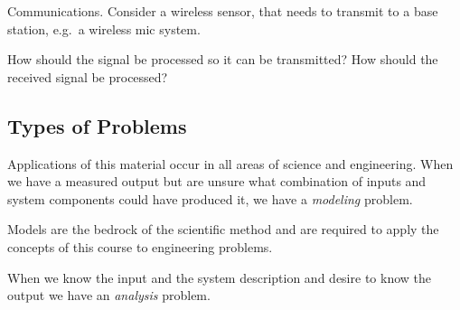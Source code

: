 \begin{example} Communications. Consider a wireless sensor, that needs to transmit to a base station, e.g.\ a wireless mic system. 
  \begin{center}
  \end{center}

  How should the signal be processed so it can be transmitted? How should the received signal be processed?
\end{example}

\subsection*{Types of Problems}
Applications of this material occur in all areas of science and engineering. When we have a measured output but are unsure what combination of inputs and system components could have produced it, we have a \textit{modeling} problem.

\begin{center}
\end{center}

Models are the bedrock of the scientific method and are required to apply the concepts of this course to engineering problems. 

When we know the input and the system description and desire to know the output we have an \textit{analysis} problem. 

